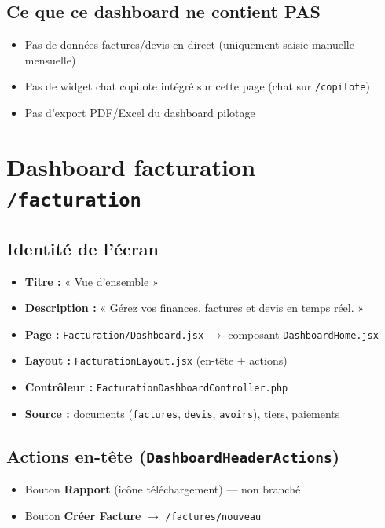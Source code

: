 \documentclass[11pt,a4paper]{report}
\newcommand{\filepath}[1]{\texttt{\small #1}}
\newcommand{\route}[1]{\texttt{\small #1}}
\begin{document}
\section{Ce que ce dashboard ne contient PAS}

\begin{itemize}[leftmargin=1.5em]
    \item Pas de données factures/devis en direct (uniquement saisie manuelle mensuelle)
    \item Pas de widget chat copilote intégré sur cette page (chat sur \route{/copilote})
    \item Pas d'export PDF/Excel du dashboard pilotage
\end{itemize}

\chapter{Dashboard facturation — \route{/facturation}}

\section{Identité de l'écran}

\begin{itemize}[leftmargin=1.5em]
    \item \textbf{Titre :} « Vue d'ensemble »
    \item \textbf{Description :} « Gérez vos finances, factures et devis en temps réel. »
    \item \textbf{Page :} \filepath{Facturation/Dashboard.jsx} $\rightarrow$ composant \filepath{DashboardHome.jsx}
    \item \textbf{Layout :} \filepath{FacturationLayout.jsx} (en-tête + actions)
    \item \textbf{Contrôleur :} \filepath{FacturationDashboardController.php}
    \item \textbf{Source :} documents (\texttt{factures}, \texttt{devis}, \texttt{avoirs}), tiers, paiements
\end{itemize}

\section{Actions en-tête (\filepath{DashboardHeaderActions})}

\begin{itemize}[leftmargin=1.5em]
    \item Bouton \textbf{Rapport} (icône téléchargement) — \textcolor{copifiwarn}{non branché}
    \item Bouton \textbf{Créer Facture} $\rightarrow$ \route{/factures/nouveau}
\end{itemize}
\end{document}
